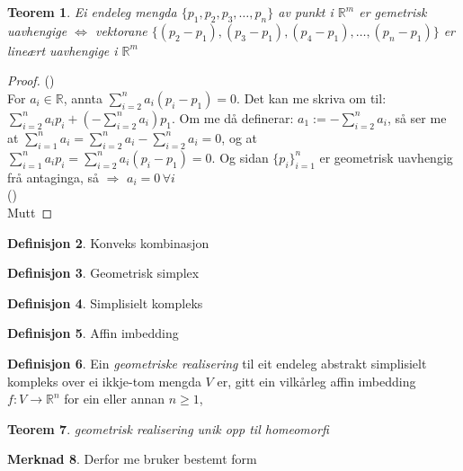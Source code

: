\documentclass[a4paper, titlepage, 12pt, norsk]{article}
\theoremstyle{plain}
\newtheorem{theorem}{Teorem}[section]
\theoremstyle{definition}
\newtheorem{definition}[theorem]{Definisjon}
\newtheorem{remark}[theorem]{Merknad}
\newcommand{\R}{\mathbb{R}}
\begin{document}
\begin{theorem}
	Ei endeleg mengda $\{p_1, p_2, p_3, \dots, p_n \}$ av punkt i $\R^m$ er gemetrisk uavhengige $\Leftrightarrow$ vektorane $\{(p_2-p_1), (p_3-p_1), (p_4-p_1),\dots,(p_n-p_1)\}$ er lineært uavhengige i $\R^m$
\end{theorem}
\begin{proof}
	(\Rightarrow)
	\\For $a_i\in\R$, annta $\sum_{i=2}^na_i(p_i-p_1)=0$. Det kan me skriva om til: $\sum_{i=2}^na_ip_i + \left(-\sum_{i=2}^na_i\right)p_1$. Om me då definerar: $a_1 := -\sum_{i=2}^na_i$, så ser me at $\sum_{i=1}^na_i=\sum_{i=2}^na_i-\sum_{i=2}^na_i=0$, og at $\sum_{i=1}^na_ip_i=\sum_{i=2}^na_i(p_i-p_1)=0$. Og sidan $\{p_i\}_{i=1}^n$ er geometrisk uavhengig frå antaginga, så $\Rightarrow$ $a_i=0 \, \forall i$ 	
	\\(\Leftarrow)
	\\Mutt
\end{proof}
\begin{definition}
	Konveks kombinasjon
\end{definition}
\begin{definition}
	Geometrisk simplex
\end{definition}
\begin{definition}
	Simplisielt kompleks
\end{definition}
\begin{definition}
	Affin imbedding
\end{definition}
\begin{definition}
	Ein \emph{geometriske realisering} til eit endeleg abstrakt simplisielt kompleks over ei ikkje-tom mengda $V$ er, gitt ein vilkårleg affin imbedding $f:V\to\R^n$ for ein eller annan $n\geq1$, 
\end{definition}
\begin{theorem}
	geometrisk realisering unik opp til homeomorfi
\end{theorem}
\begin{remark}
	Derfor me bruker bestemt form
\end{remark}
\end{document}
